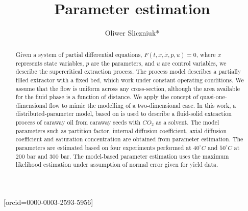 \documentclass[a4paper,fleqn]{cas-dc}
\begin{document}
 

\title[mode=title]{Parameter estimation}                      


\author[1]{Oliwer Sliczniuk*}[orcid=0000-0003-2593-5956]
\cormark[1]



\address[1]{Aalto University, School of Chemical Engineering, Espoo, 02150, Finland}


\begin{abstract}
Given a system of partial differential equations, $F(t,x,\dot{x},p,u)=0$, where $x$ represents state variables, $p$ are the parameters, and $u$ are control variables, we describe the supercritical extraction process. The process model describes a partially filled extractor with a fixed bed, which work under constant operating conditions. We assume that the flow is uniform across any cross-section, although the area available for the fluid phase is a function of distance. We apply the concept of quasi-one-dimensional flow to mimic the modelling of a two-dimensional case.
In this work, a distributed-parameter model, based on \citet{Reverchon1996} is used to describe a fluid-solid extraction process of caraway oil from caraway seeds with $CO_2$ as a solvent. The model parameters such as partition factor, internal diffusion coefficient, axial diffusion coefficient and saturation concentration are obtained from parameter estimation. The parameters are estimated based on four experiments performed at $40^\circ C$ and $50^\circ C$ at $200$ bar and $300$ bar. The model-based parameter estimation uses the maximum likelihood estimation under assumption of normal error given for yield data.

\end{abstract}
\end{document}

